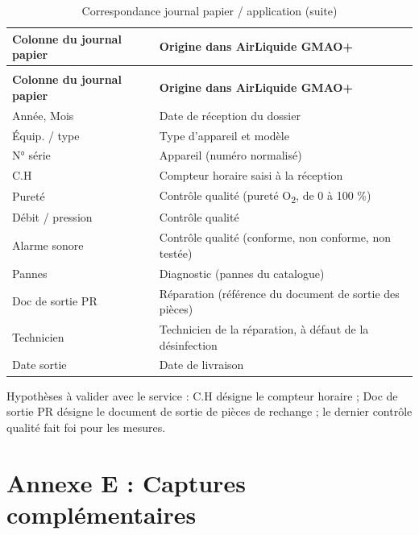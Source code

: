 {\small{}\renewcommand{\arraystretch}{1.3}
\begin{longtable}{|>{\raggedright\arraybackslash}p{5.02cm}|>{\raggedright\arraybackslash}p{9.59cm}|}
\caption{Correspondance journal papier / application}\\
\hline
\rowcolor{ALbleu} \sffamily\bfseries\color{white} Colonne du journal papier & \sffamily\bfseries\color{white} Origine dans AirLiquide GMAO+ \\ \hline
\endfirsthead
\caption[]{Correspondance journal papier / application (suite)}\\
\hline
\rowcolor{ALbleu} \sffamily\bfseries\color{white} Colonne du journal papier & \sffamily\bfseries\color{white} Origine dans AirLiquide GMAO+ \\ \hline
\endhead
Année, Mois & Date de réception du dossier \\ \hline
\rowcolor{ALgris} Équip. / type & Type d'appareil et modèle \\ \hline
N° série & Appareil (numéro normalisé) \\ \hline
\rowcolor{ALgris} C.H & Compteur horaire saisi à la réception \\ \hline
Pureté & Contrôle qualité (pureté O\textsubscript{2}, de 0 à 100 \%) \\ \hline
\rowcolor{ALgris} Débit / pression & Contrôle qualité \\ \hline
Alarme sonore & Contrôle qualité (conforme, non conforme, non testée) \\ \hline
\rowcolor{ALgris} Pannes & Diagnostic (pannes du catalogue) \\ \hline
Doc de sortie PR & Réparation (référence du document de sortie des pièces) \\ \hline
\rowcolor{ALgris} Technicien & Technicien de la réparation, à défaut de la désinfection \\ \hline
Date sortie & Date de livraison \\ \hline
\end{longtable}
}

Hypothèses à valider avec le service : \og{}C.H\fg{} désigne le compteur horaire ; \og{}Doc de sortie PR\fg{} désigne le document de sortie de pièces de rechange ; le dernier contrôle qualité fait foi pour les mesures.

\section*{Annexe E : Captures complémentaires}

